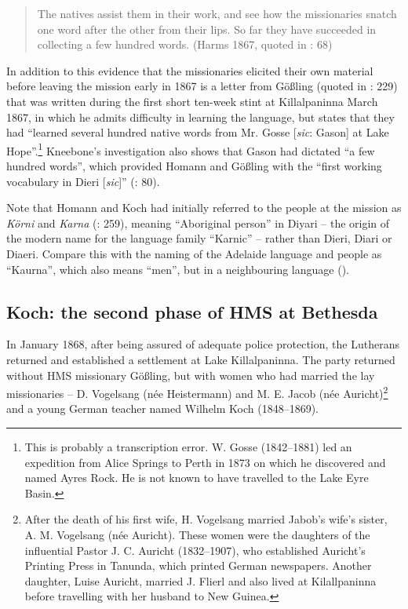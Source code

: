 \begin{quote}
    The natives assist them in their work, and see how the missionaries snatch one word after the other from their lips. So far they have succeeded in collecting a few hundred words. (Harms 1867, quoted in \citealt{proeve_work_1952}: 68)
\end{quote}


In addition to this evidence that the missionaries elicited their own material before leaving the mission early in 1867 is a letter from Gößling (quoted in \citealt{brauer_history_1956}: 229) that was written during the first short ten-week stint at Killalpaninna March 1867, in which he admits difficulty in learning the language, but states that they had “learned several hundred native words from Mr. Gosse [\textit{sic}: Gason] at Lake Hope”.\footnote{This is probably a transcription error. W. Gosse (1842--1881) led an expedition from Alice Springs to Perth in 1873 on which he discovered and named Ayres Rock. He is not known to have travelled to the Lake Eyre Basin.} Kneebone’s investigation also shows that Gason had dictated “a few hundred words'', which provided Homann and Gößling with the ``first working vocabulary in Dieri [\textit{sic}]” (\citeyear{kneebone_teichelmann_2005}: 80).

Note that Homann and Koch had initially referred to the people at the mission as \textit{Körni} and \textit{Karna} (\citeyear{kneebone_teichelmann_2005}: 259), meaning “Aboriginal person” in Diyari – the origin of the modern name for the language family “Karnic” – rather than Dieri, Diari or Diaeri. Compare this with the naming of the Adelaide language and people as “Kaurna'', which also means “men'', but in a neighbouring language ().



\subsection{Koch: the second phase of HMS at Bethesda}
\label{sec:key:8.3.2}

In January 1868, after being assured of adequate police protection, the Lutherans returned and established a settlement at Lake Killalpaninna. The party returned without HMS missionary Gößling, but with women who had married the lay missionaries – D. Vogelsang (née Heistermann) and M. E. Jacob (née Auricht)\footnote{After the death of his first wife, H. Vogelsang married Jabob’s wife’s sister, A. M. Vogelsang (née Auricht). These women were the daughters of the influential Pastor J. C. Auricht (1832--1907), who established Auricht’s Printing Press in Tanunda, which printed German newspapers. Another daughter, Luise Auricht, married J. Flierl and also lived at Kilallpaninna before travelling with her husband to New Guinea.} and a young German teacher named Wilhelm Koch (1848--1869).

